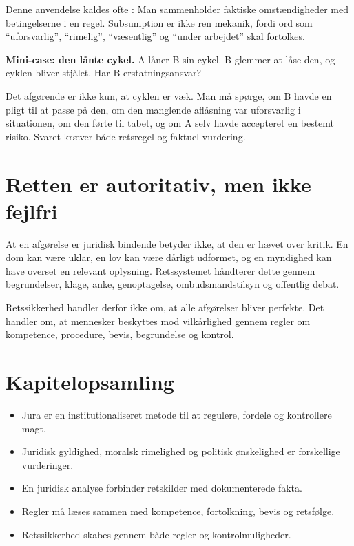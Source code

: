Denne anvendelse kaldes ofte : Man sammenholder faktiske omstændigheder med betingelserne i en regel. Subsumption er ikke ren mekanik, fordi ord som ``uforsvarlig'', ``rimelig'', ``væsentlig'' og ``under arbejdet'' skal fortolkes.

\begin{examplebox}
\textbf{Mini-case: den lånte cykel.} A låner B sin cykel. B glemmer at låse den, og cyklen bliver stjålet. Har B erstatningsansvar?

Det afgørende er ikke kun, at cyklen er væk. Man må spørge, om B havde en pligt til at passe på den, om den manglende aflåsning var uforsvarlig i situationen, om den førte til tabet, og om A selv havde accepteret en bestemt risiko. Svaret kræver både retsregel og faktuel vurdering.
\end{examplebox}

\section{Retten er autoritativ, men ikke fejlfri}

At en afgørelse er juridisk bindende betyder ikke, at den er hævet over kritik. En dom kan være uklar, en lov kan være dårligt udformet, og en myndighed kan have overset en relevant oplysning. Retssystemet håndterer dette gennem begrundelser, klage, anke, genoptagelse, ombudsmandstilsyn og offentlig debat.

Retssikkerhed handler derfor ikke om, at alle afgørelser bliver perfekte. Det handler om, at mennesker beskyttes mod vilkårlighed gennem regler om kompetence, procedure, bevis, begrundelse og kontrol.


\section*{Kapitelopsamling}
\begin{itemize}
  \item Jura er en institutionaliseret metode til at regulere, fordele og kontrollere magt.
  \item Juridisk gyldighed, moralsk rimelighed og politisk ønskelighed er forskellige vurderinger.
  \item En juridisk analyse forbinder retskilder med dokumenterede fakta.
  \item Regler må læses sammen med kompetence, fortolkning, bevis og retsfølge.
  \item Retssikkerhed skabes gennem både regler og kontrolmuligheder.
\end{itemize}

